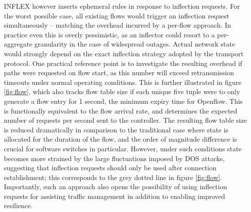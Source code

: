 INFLEX however inserts ephemeral rules in response to inflection requests.
For the worst possible case, all existing flows would trigger an inflection request simultaneously -- matching the overhead incurred by a per-flow approach.
In practice even this is overly pessimistic, as an inflector could resort to a per-aggregate granularity in the case of widespread outages.
Actual network state would strongly depend on the exact inflection strategy adopted by the transport protocol.
One practical reference point is to investigate the resulting overhead if paths were requested on flow start, as this number will exceed retransmission timeouts under normal operating conditions.
This is further illustrated in figure \ref{fig:flow}, which also tracks flow table size if each unique five tuple were to only generate a flow entry for 1 second, the minimum expiry time for Openflow.
This is functionally equivalent to the flow arrival rate, and determines the expected number of requests per second sent to the controller.
The resulting flow table size is reduced dramatically in comparison to the traditional case where state is allocated for the duration of the flow, and the order of magnitude difference is crucial for software switches in particular.
However, under such conditions state becomes more strained by the large fluctuations imposed by \ac{DOS} attacks, suggesting that inflection requests should only be used after connection establishment; this corresponds to the grey dotted line in figure \ref{fig:flow}. Importantly, such an approach also opens the possibility of using inflection requests for assisting traffic management in addition to enabling improved resilience.


